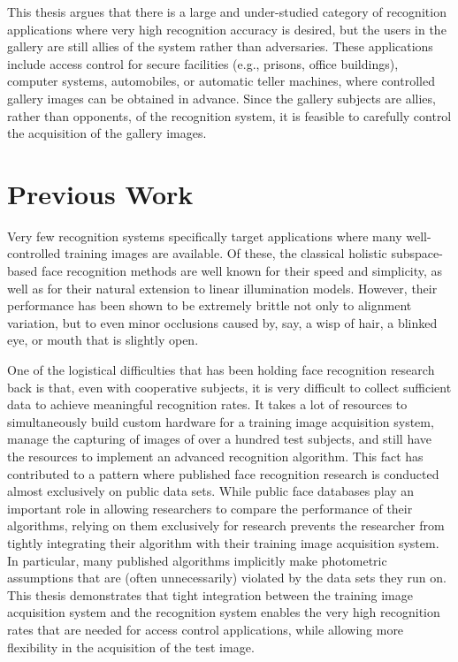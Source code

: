 This thesis argues that there is a large and under-studied category of
recognition applications where very high recognition accuracy is desired, but
the users in the gallery are still allies of the system rather than
adversaries.  These applications include access control for secure facilities
(e.g., prisons, office buildings), computer systems, automobiles, or automatic
teller machines, where controlled gallery images can be obtained in advance.
Since the gallery subjects are allies, rather than opponents, of the
recognition system, it is feasible to carefully control the acquisition of the
gallery images. 



\section{Previous Work} Very few recognition systems specifically target
applications where many well-controlled training images are available.  Of
these, the classical holistic subspace-based face recognition methods
\cite{Turk1991-CVPR,Belhumeur1997-PAMI} are well known for their speed and
simplicity, as well as for their natural extension to linear illumination
models.  However, their performance has been shown to be extremely brittle not
only to alignment variation, but to even minor occlusions caused by, say, a
wisp of hair, a blinked eye, or mouth that is slightly open. 

One of the logistical difficulties that has been holding face recognition
research back is that, even with cooperative subjects, it is very difficult to
collect sufficient data to achieve meaningful recognition rates.  It takes a
lot of resources to simultaneously build custom hardware for a training image
acquisition system, manage the capturing of images of over a hundred test
subjects, and still have the resources to implement an advanced recognition
algorithm.  This fact has contributed to a pattern where published face
recognition research is conducted almost exclusively on public data sets.
While public face databases play an important role in allowing researchers to
compare the performance of their algorithms, relying on them exclusively for
research prevents the researcher from tightly integrating their algorithm with
their training image acquisition system.  In particular, many published
algorithms implicitly make photometric assumptions that are (often
unnecessarily) violated by the data sets they run on.  This thesis demonstrates
that tight integration between the training image acquisition system and the
recognition system enables the very high recognition rates that are needed for
access control applications, while allowing more flexibility in the acquisition
of the test image.

